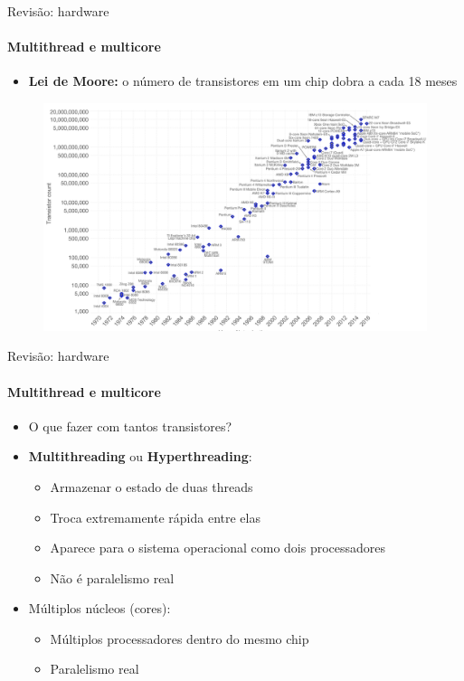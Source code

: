 \documentclass{beamer}
\begin{document}
\begin{frame}{Revisão: hardware}
	\framesubtitle{Multithread e multicore}
	\begin{itemize}
		\item \textbf{Lei de Moore:} o número de transistores em um chip dobra a cada 18 meses
	\end{itemize}
	\begin{figure}
		\includegraphics[width=0.7\paperwidth]{resources/moore}
	\end{figure}
\end{frame}
\begin{frame}{Revisão: hardware}
	\framesubtitle{Multithread e multicore}
	\begin{itemize}
		\item O que fazer com tantos transistores?
		\item \textbf{Multithreading} ou \textbf{Hyperthreading}:
		\begin{itemize}
			\item Armazenar o estado de duas threads
			\item Troca extremamente rápida entre elas
			\item Aparece para o sistema operacional como dois processadores
			\item Não é paralelismo real
		\end{itemize}
		\item Múltiplos núcleos (cores):
		\begin{itemize}
			\item Múltiplos processadores dentro do mesmo chip
			\item Paralelismo real
		\end{itemize}
	\end{itemize}
\end{frame}
\end{document}
